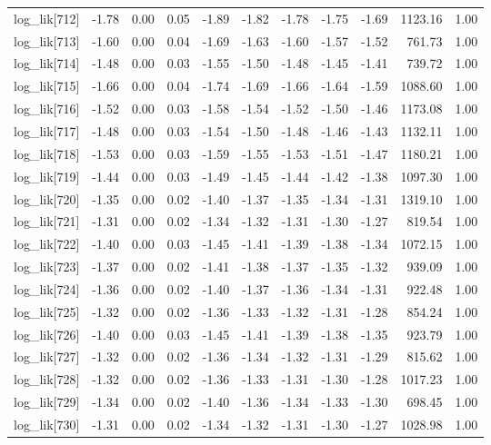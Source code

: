 \begin{table}[ht]
\begin{tabular}{rrrrrrrrrrr}
  log\_lik[712] & -1.78 & 0.00 & 0.05 & -1.89 & -1.82 & -1.78 & -1.75 & -1.69 & 1123.16 & 1.00 \\ 
  log\_lik[713] & -1.60 & 0.00 & 0.04 & -1.69 & -1.63 & -1.60 & -1.57 & -1.52 & 761.73 & 1.00 \\ 
  log\_lik[714] & -1.48 & 0.00 & 0.03 & -1.55 & -1.50 & -1.48 & -1.45 & -1.41 & 739.72 & 1.00 \\ 
  log\_lik[715] & -1.66 & 0.00 & 0.04 & -1.74 & -1.69 & -1.66 & -1.64 & -1.59 & 1088.60 & 1.00 \\ 
  log\_lik[716] & -1.52 & 0.00 & 0.03 & -1.58 & -1.54 & -1.52 & -1.50 & -1.46 & 1173.08 & 1.00 \\ 
  log\_lik[717] & -1.48 & 0.00 & 0.03 & -1.54 & -1.50 & -1.48 & -1.46 & -1.43 & 1132.11 & 1.00 \\ 
  log\_lik[718] & -1.53 & 0.00 & 0.03 & -1.59 & -1.55 & -1.53 & -1.51 & -1.47 & 1180.21 & 1.00 \\ 
  log\_lik[719] & -1.44 & 0.00 & 0.03 & -1.49 & -1.45 & -1.44 & -1.42 & -1.38 & 1097.30 & 1.00 \\ 
  log\_lik[720] & -1.35 & 0.00 & 0.02 & -1.40 & -1.37 & -1.35 & -1.34 & -1.31 & 1319.10 & 1.00 \\ 
  log\_lik[721] & -1.31 & 0.00 & 0.02 & -1.34 & -1.32 & -1.31 & -1.30 & -1.27 & 819.54 & 1.00 \\ 
  log\_lik[722] & -1.40 & 0.00 & 0.03 & -1.45 & -1.41 & -1.39 & -1.38 & -1.34 & 1072.15 & 1.00 \\ 
  log\_lik[723] & -1.37 & 0.00 & 0.02 & -1.41 & -1.38 & -1.37 & -1.35 & -1.32 & 939.09 & 1.00 \\ 
  log\_lik[724] & -1.36 & 0.00 & 0.02 & -1.40 & -1.37 & -1.36 & -1.34 & -1.31 & 922.48 & 1.00 \\ 
  log\_lik[725] & -1.32 & 0.00 & 0.02 & -1.36 & -1.33 & -1.32 & -1.31 & -1.28 & 854.24 & 1.00 \\ 
  log\_lik[726] & -1.40 & 0.00 & 0.03 & -1.45 & -1.41 & -1.39 & -1.38 & -1.35 & 923.79 & 1.00 \\ 
  log\_lik[727] & -1.32 & 0.00 & 0.02 & -1.36 & -1.34 & -1.32 & -1.31 & -1.29 & 815.62 & 1.00 \\ 
  log\_lik[728] & -1.32 & 0.00 & 0.02 & -1.36 & -1.33 & -1.31 & -1.30 & -1.28 & 1017.23 & 1.00 \\ 
  log\_lik[729] & -1.34 & 0.00 & 0.02 & -1.40 & -1.36 & -1.34 & -1.33 & -1.30 & 698.45 & 1.00 \\ 
  log\_lik[730] & -1.31 & 0.00 & 0.02 & -1.34 & -1.32 & -1.31 & -1.30 & -1.27 & 1028.98 & 1.00 \\ 

\end{tabular}
\end{table}
